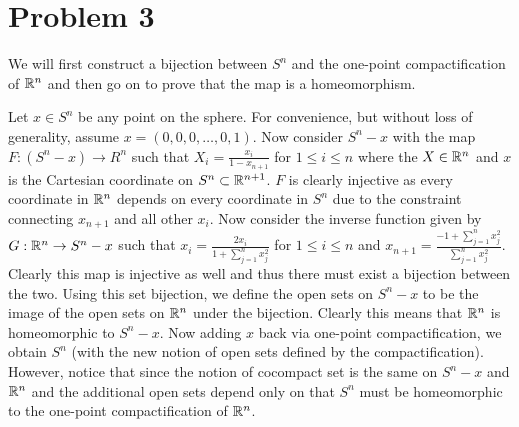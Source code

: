 \section*{Problem 3}
We will first construct a bijection between $S^n$ and the one-point compactification of $\mathbb{R}^n$ and then go on to prove that the map is a homeomorphism.  \par

Let $x\in S^n$ be any point on the sphere. For convenience, but without loss of generality, assume $x=(0,0,0,\ldots,0,1)$. Now consider $S^n-{x}$ with the map $F: (S^n-{x}) \to R^n$ such that $X_i = \frac{x_i}{1-x_{n+1}}$ for $1\leq i \leq n$ where the $X\in \mathbb{R}^n$ and $x$ is the Cartesian coordinate on $S^n\subset \mathbb{R}^{n+1}$. $F$ is clearly injective as every coordinate in $\mathbb{R}^n$ depends on every coordinate in $S^n$ due to the constraint connecting $x_{n+1}$ and all other $x_i$. Now consider the inverse function given by $G: \mathbb{R}^n \to S^n-{x}$ such that $x_i = \frac{2 x_i}{1+\sum_{j=1}^n x_j^2}$ for $1\leq i \leq n$ and 
$x_{n+1} = \frac{-1+\sum_{j=1}^n x_j^2}{\sum_{j=1}^n x_j^2}$. Clearly this map is injective as well and thus there must exist a bijection between the two. Using this set bijection, we define the open sets on $S^n-{x}$ to be the image of the open sets on $\mathbb{R}^n$ under the bijection. Clearly this means that $\mathbb{R}^n$ is homeomorphic to $S^n-{x}$. Now adding $x$ back via one-point compactification, we obtain $S^n$ (with the new notion of open sets defined by the compactification). However, notice that since the notion of cocompact set is the same on $S^n-{x}$ and $\mathbb{R}^n$ and the additional open sets depend only on that $S^n$ must be homeomorphic to the one-point compactification of $\mathbb{R}^n$.

